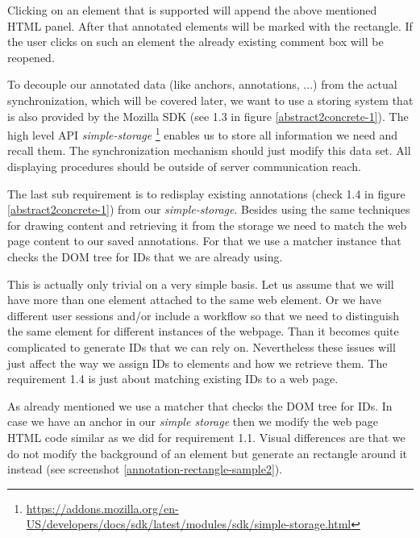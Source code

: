 Clicking on an element that is supported will append the above mentioned HTML panel. After that annotated elements will be marked with the rectangle. If the user clicks on such an element the already existing comment box will be reopened. 

To decouple our annotated data (like anchors, annotations, ...) from the actual synchronization, which will be covered later, we want to use a storing system that is also provided by the Mozilla SDK (see 1.3 in figure \ref{abstract2concrete-1}). The high level API \emph{simple-storage} \footnote{\url{https://addons.mozilla.org/en-US/developers/docs/sdk/latest/modules/sdk/simple-storage.html}} enables us to store all information we need and recall them. The synchronization mechanism should just modify this data set. All displaying procedures should be outside of server communication reach. 

The last sub requirement is to redisplay existing annotations (check 1.4 in figure \ref{abstract2concrete-1}) from our \emph{simple-storage}. Besides using the same techniques for drawing content and retrieving it from the storage we need to match the web page content to our saved annotations. For that we use a matcher instance that checks the DOM tree for IDs that we are already using. 

This is actually only trivial on a very simple basis. Let us assume that we will have more than one element attached to the same web element. Or we have different user sessions and/or include a workflow so that we need to distinguish the same element for different instances of the webpage. Than it becomes quite complicated to generate IDs that we can rely on. Nevertheless these issues will just affect the way we assign IDs to elements and how we retrieve them. The requirement 1.4 is just about matching existing IDs to a web page. 

As already mentioned we use a matcher that checks the DOM tree for IDs. In case we have an anchor in our \emph{simple storage} then we modify the web page HTML code similar as we did for requirement 1.1. Visual differences are that we do not modify the background of an element but generate an rectangle around it instead (see screenshot \ref{annotation-rectangle-sample2}). 

